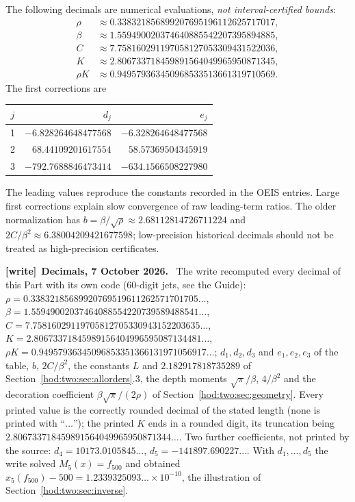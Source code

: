 \documentclass[11pt,letterpaper]{article}
\theoremstyle{definition}\newtheorem{definition}[theorem]{Definition}
\theoremstyle{remark}\newtheorem{remark}[theorem]{Remark}
\newenvironment{writenote}[1][]{\par\smallskip\begingroup\small
 \noindent\textbf{[write]}\if\relax\detokenize{#1}\relax\else~\textbf{#1.}\fi\ }%
 {\par\endgroup\smallskip}
\begin{document}
The following decimals are numerical evaluations, \emph{not interval-certified bounds}:
\begin{align*}
\rho&\approx0.338321856899207695196112625717017,\\
\beta&\approx1.559490020374640885542207395894885,\\
C&\approx7.758160291197058127053309431522036,\\
K&\approx2.806733718459891564049965950871345,\\
\rho K&\approx0.949579363450968533513661319710569.
\end{align*}
The first corrections are
\begin{center}
\begin{tabular}{crr}
\toprule
$j$&$d_j$&$e_j$\\\midrule
1&$-6.828264648477568$&$-6.328264648477568$\\
2&$68.44109201617554$&$58.57369504345919$\\
3&$-792.7688846473414$&$-634.1566508227980$\\\bottomrule
\end{tabular}
\end{center}
The leading values reproduce the constants recorded in the OEIS entries. Large first corrections explain slow convergence of raw leading-term ratios. The older normalization has $b=\beta/\sqrt\rho\approx2.68112814726711224$ and $2C/\beta^2\approx6.38004209421677598$; low-precision historical decimals should not be treated as high-precision certificates.
\begin{writenote}[Decimals, 7 October 2026]
The write recomputed every decimal of this Part with its own code (60-digit
jets, see the Guide): $\rho=0.33832185689920769519611262571701705\ldots$,
$\beta=1.55949002037464088554220739589488541\ldots$,
$C=7.75816029119705812705330943152203635\ldots$,
$K=2.80673371845989156404996595087134481\ldots$,
$\rho K=0.94957936345096853351366131971056917\ldots$; $d_1,d_2,d_3$ and
$e_1,e_2,e_3$ of the table, $b$, $2C/\beta^2$, the constants $L$ and
$2.182917818735289$ of Section~\ref{hod:two:sec:allorders}.3, the depth
moments $\sqrt\pi/\beta$, $4/\beta^2$ and the decoration coefficient
$\beta\sqrt\pi/(2\rho)$ of Section~\ref{hod:two:sec:geometry}. Every printed
value is the correctly rounded decimal of the stated length (none is printed
with ``$\ldots$''); the printed $K$ ends in a rounded digit, its truncation
being $2.806733718459891564049965950871344\ldots$. Two further coefficients,
not printed by the source: $d_4=10173.0105845\ldots$,
$d_5=-141897.690227\ldots$. With $d_1,\ldots,d_5$ the write solved $M_5(x)=f_{500}$
and obtained $x_5(f_{500})-500=1.2339325093\ldots\times10^{-10}$, the
illustration of Section~\ref{hod:two:sec:inverse}.
\end{writenote}
\end{document}
